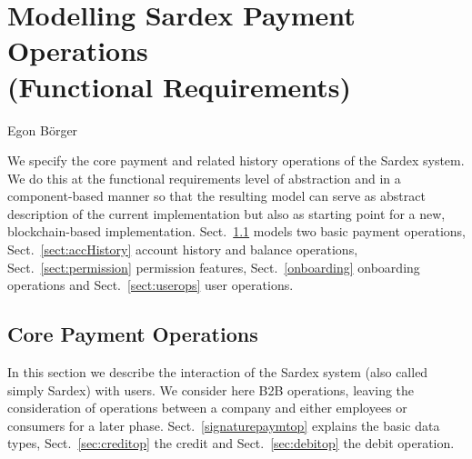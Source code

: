 \chapter{Modelling Sardex Payment Operations\\ (Functional Requirements)}
\label{ch:funreq}


\vspace{-1cm}
\begin{center}
Egon B\"orger
\end{center}


We specify the core payment and related history operations of the Sardex system. We do this at the functional requirements  level of abstraction and in a component-based manner so that the resulting model can serve as abstract description of the current implementation but also as starting point for a new, blockchain-based implementation. Sect.~\ref{sect:paymtops} models  two basic payment operations, Sect.~\ref{sect:accHistory} account history and balance operations, Sect.~\ref{sect:permission} permission features, Sect.~\ref{onboarding} onboarding operations and Sect.~\ref{sect:userops} user operations.


\section{Core Payment Operations}
\label{sect:paymtops}

In this section we describe the interaction of the Sardex system (also called simply Sardex)  with users. We consider here B2B operations, leaving the consideration of operations between a company and either employees or consumers for a later phase. Sect.~\ref{signaturepaymtop} explains the basic data types,  Sect.~\ref{sec:creditop} the credit and  Sect.~\ref{sec:debitop} the debit operation.

